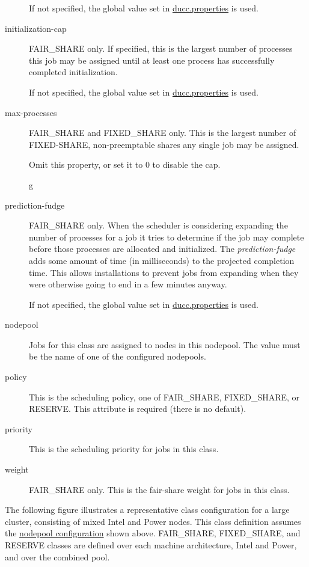 \begin{description}
        If not specified, the global value set in \hyperref[sec:ducc.properties]{ducc.properties} is used.

      \item[initialization-cap] FAIR\_SHARE only. If specified, this is the largest number of processes this job
        may be assigned until at least one process has successfully completed initialization.

        If not specified, the global value set in \hyperref[sec:ducc.properties]{ducc.properties} is used.

      \item[max-processes] FAIR\_SHARE and FIXED\_SHARE only.  This is the largest number of FIXED-SHARE,
        non-preemptable shares any single job may be assigned.

        Omit this property, or set it to 0 to disable the cap.

g      \item[prediction-fudge] FAIR\_SHARE only. When the scheduler is considering expanding the
        number of processes for a job it tries to determine if the job may complete before those
        processes are allocated and initialized.  The {\em prediction-fudge} adds some amount of 
        time (in milliseconds) to the projected completion time.  This allows installations to
        prevent jobs from expanding when they were otherwise going to end in a few minutes
        anyway.

        If not specified, the global value set in \hyperref[sec:ducc.properties]{ducc.properties} is used.

      \item[nodepool] Jobs for this class are assigned to nodes in this nodepool. The
        value must be the name of one of the configured nodepools.

      \item[policy] This is the scheduling policy, one of FAIR\_SHARE, FIXED\_SHARE, or RESERVE. This
        attribute is required (there is no default).

      \item[priority] This is the scheduling priority for jobs in this class.

      \item[weight] FAIR\_SHARE only. This is the fair-share weight for jobs in this class.
      
    \end{description}

    The following figure illustrates a representative class configuration for a large cluster,
    consisting of mixed Intel and Power nodes.  This class definition assumes the
    \hyperref[fig:nodepool.configuration]{nodepool configuration} shown above.  FAIR\_SHARE,
    FIXED\_SHARE, and RESERVE classes are defined over each machine architecture, Intel and Power,
    and over the combined pool. 

